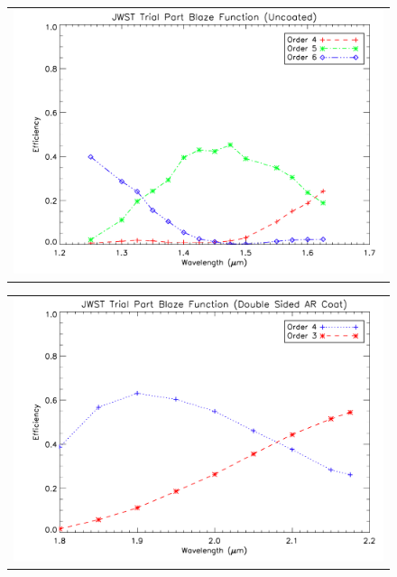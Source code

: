    \begin{figure}
   \begin{minipage}[b]{0.5\linewidth} %
   \begin{tabular}{c}
   \includegraphics[width=\textwidth]{chSPIE_2010_JWST/figs/A7I_uncoated_trans.pdf}
   \end{tabular}
   \end{minipage}
   \hspace{0.01cm} %
\begin{minipage}[b]{0.5\linewidth}
   \begin{tabular}{c}
   \includegraphics[width=\textwidth]{chSPIE_2010_JWST/figs/A7I_coated_2.pdf}

\end{tabular}
\end{minipage}
\end{figure}
